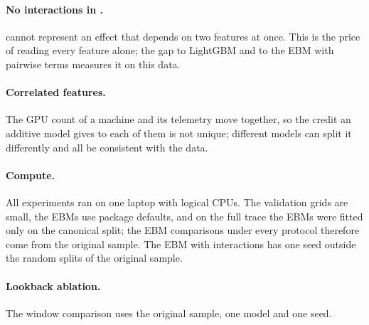 \paragraph{No interactions in \kaam{}.} \kaam{} cannot represent an effect that depends on two features at once. This is the price of reading every feature alone; the gap to LightGBM and to the EBM with pairwise terms measures it on this data.

\paragraph{Correlated features.} The GPU count of a machine and its telemetry move together, so the credit an additive model gives to each of them is not unique; different models can split it differently and all be consistent with the data.

\paragraph{Compute.} All experiments ran on one laptop with  logical CPUs. The validation grids are small, the EBMs use package defaults, and on the full trace the EBMs were fitted only on the canonical split; the EBM comparisons under every protocol therefore come from the original sample. The EBM with interactions has one seed outside the random splits of the original sample.

\paragraph{Lookback ablation.} The window comparison uses the original sample, one model and one seed.
